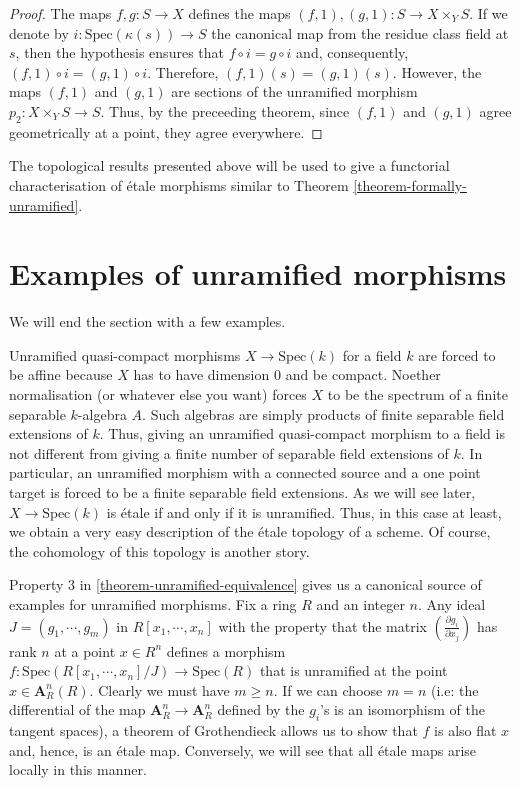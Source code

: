 \begin{proof}
The maps $f,g:S \to X$ defines the maps $(f,1),(g,1):S \to X \times_Y S$. If
we denote by $i:\text{Spec}(\kappa(s)) \to S$ the canonical map from the residue
class field at $s$, then the hypothesis ensures that $f\circ i = g\circ i$
and, consequently, $(f,1)\circ i = (g,1) \circ i$. Therefore,
$(f,1)(s) = (g,1)(s)$. However, the maps $(f,1)$ and $(g,1)$ are sections of
the unramified morphism $p_2:X\times_Y S \to S$. Thus, by the preceeding
theorem, since $(f,1)$ and $(g,1)$ agree geometrically at a point, they agree
everywhere.
\end{proof}

\noindent
The topological results presented above will be used to give a functorial
characterisation of \'etale morphisms similar to Theorem
\ref{theorem-formally-unramified}.

\section{Examples of unramified morphisms}
\label{section-examples}

\noindent
We will end the section with a few examples.

\begin{example}
\label{example-etale-field-extensions}
Unramified quasi-compact morphisms $X \to \text{Spec}(k)$ for a field $k$ are 
forced
to be affine because $X$ has to have dimension $0$ and be compact. Noether
normalisation (or whatever else you want) forces $X$ to be the spectrum of a
finite separable $k$-algebra $A$. Such algebras are simply products of finite
separable field extensions of $k$. Thus, giving an unramified quasi-compact
morphism to a field is not different from giving a finite number of separable
field extensions of $k$. In particular, an unramified morphism with a
connected source and a one point target is forced to be a finite separable
field extensions. As we will see later, $X \to \text{Spec}(k)$ is \'etale if and
only if it is unramified. Thus, in this case at least, we obtain a very easy
description of the \'etale topology of a scheme. Of course, the cohomology of
this topology is another story.
\end{example}

\begin{example}
\label{example-standard-etale}
Property $3$ in \ref{theorem-unramified-equivalence} 
gives us a canonical source of
examples for unramified morphisms. Fix a ring $R$ and an integer $n$. Any
ideal $J = (g_1,\cdots,g_m)$ in $R[x_1,\cdots,x_n]$ with the property that the
matrix $(\frac{\partial g_i}{\partial x_j})$ has rank $n$ at a point
$x \in R^n$ defines a morphism $f:\text{Spec}(R[x_1,\cdots,x_n]/J) \to 
\text{Spec}(R)$
that is unramified at the point $x \in \mathbf{A}^n_R(R)$. Clearly we must have
$m \geq n$. If we can choose $m = n$ (i.e: the differential of the map
$\mathbf{A}^n_R \to \mathbf{A}^n_R$ defined by the $g_i$'s is an isomorphism of 
the tangent
spaces), a theorem of Grothendieck allows us to show that $f$ is also flat
$x$ and, hence, is an \'etale map. Conversely, we will see that all \'etale
maps arise locally in this manner.
\end{example}


